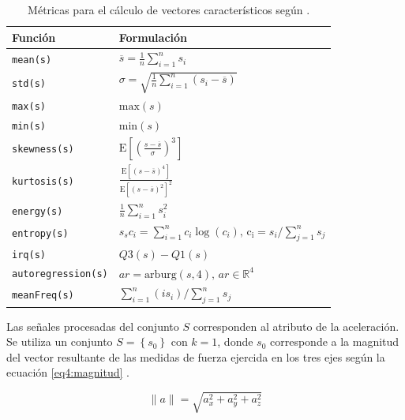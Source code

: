\begin{table}[!tbph]
\begin{centering}
\begin{tabular}{|l|l|}
\hline 
Función & Formulación\tabularnewline
\hline 
\hline 
\texttt{mean(s)} & $\overline{s}=\frac{1}{n}\sum_{i=1}^{n}s_{i}$\tabularnewline
\hline 
\texttt{std(s)} & $\sigma=\sqrt{\frac{1}{n}\sum_{i=1}^{n}\left(s_{i}-\overline{s}\right)}$\tabularnewline
\hline 
\texttt{max(s)} & $\mathrm{max}(s)$\tabularnewline
\hline 
\texttt{min(s)} & $\mathrm{min}(s)$\tabularnewline
\hline 
\texttt{skewness(s)} & $\mathrm{E}\left[\left(\frac{s-\overline{s}}{\sigma}\right)^{3}\right]$\tabularnewline
\hline 
\texttt{kurtosis(s)} & $\frac{\mathrm{E}\left[\left(s-\overline{s}\right)^{4}\right]}{\mathrm{E}\left[\left(s-\overline{s}\right)^{2}\right]^{2}}$\tabularnewline
\hline 
\texttt{energy(s)} & $\frac{1}{n}\sum_{i=1}^{n}s_{i}^{2}$\tabularnewline
\hline 
\texttt{entropy(s)} & $s_{s}c_{i}=\sum_{i=1}^{n}c_{i}\log\left(c_{i}\right)\mathrm{\mathtt{\mathrm{,}}\,c_{i}}=s_{i}/\sum_{j=1}^{n}s_{j}$\tabularnewline
\hline 
\texttt{irq(s)} & $Q3(s)-Q1(s)$\tabularnewline
\hline 
\texttt{autoregression(s)} & $ar=\mathrm{arburg}\left(s,4\right)\mathrm{,}\,ar\in\mathbb{R}^{4}$\tabularnewline
\hline 
\texttt{meanFreq(s)} & $\sum_{i=1}^{n}\left(is_{i}\right)/\sum_{j=1}^{n}s_{j}$\tabularnewline
\hline 
\end{tabular}
\par\end{centering}
\caption[Métricas de valores característicos]{\label{tab4:metricas}Métricas para el cálculo de vectores característicos
según \cite{ReyesOrtiz2015}.}
\end{table}

Las señales procesadas del conjunto $S$ corresponden al atributo
de la aceleración. Se utiliza un conjunto $S=\left\{ s_{0}\right\} $
con $k=1$, donde $s_{0}$ corresponde a la magnitud del vector resultante
de las medidas de fuerza ejercida en los tres ejes según la ecuación
\ref{eq4:magnitud} \cite{Schneider2014}.

\begin{equation}
\lVert a\rVert=\sqrt{a_{x}^{2}+a_{y}^{2}+a_{z}^{2}}\label{eq4:magnitud}
\end{equation}

